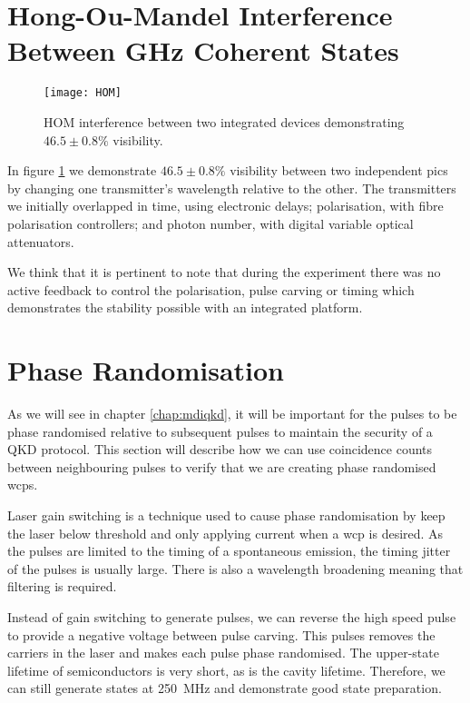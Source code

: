 \section{Hong-Ou-Mandel Interference Between GHz Coherent States}

\begin{figure}[tbp]
	\centering
	\texttt{[image: HOM]}
	\caption[Hong-Ou-Mandel interference between integrated devices]{\ac{HOM} interference between two integrated devices demonstrating $46.5\pm0.8\%$ visibility.}
	\label{fig:HOM}
\end{figure}

In figure \ref{fig:HOM} we demonstrate $46.5 \pm 0.8  \%$ visibility between two independent \acp{pic} by changing one transmitter's wavelength relative to the other. The transmitters we initially overlapped in time, using electronic delays; polarisation, with fibre polarisation controllers; and photon number, with digital variable optical attenuators. 

We think that it is pertinent to note that during the experiment there was no active feedback to control the polarisation, pulse carving or timing which demonstrates the stability possible with an integrated platform. 

\section{Phase Randomisation}

As we will see in chapter \ref{chap:mdiqkd}, it will be important for the pulses to be phase randomised relative to subsequent pulses to maintain the security of a \ac{QKD} protocol. This section will describe how we can use coincidence counts between neighbouring pulses to verify that we are creating phase randomised \acp{wcp}.

Laser gain switching is a technique used to cause phase randomisation by keep the laser below threshold and only applying current when a \ac{wcp} is desired. As the pulses are limited to the timing of a spontaneous emission, the timing jitter of the pulses is usually large. There is also a wavelength broadening meaning that filtering is required. 

Instead of gain switching to generate pulses, we can reverse the high speed pulse to provide a negative voltage between pulse carving. This pulses removes the carriers in the laser and makes each pulse phase randomised. The upper-state lifetime of semiconductors is very short, as is the cavity lifetime. Therefore, we can still generate states at \SI{250}{MHz} and demonstrate good state preparation.

